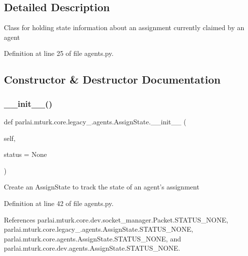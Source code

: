 \subsection{Detailed Description}
\begin{DoxyVerb}Class for holding state information about an assignment currently
claimed by an agent
\end{DoxyVerb}
 

Definition at line 25 of file agents.\+py.



\subsection{Constructor \& Destructor Documentation}
\mbox{\label{classparlai_1_1mturk_1_1core_1_1legacy__2018_1_1agents_1_1AssignState_a9451ae6465429d1cd27e208fd3f852bf}} 
\subsubsection{\texorpdfstring{\+\_\+\+\_\+init\+\_\+\+\_\+()}{\_\_init\_\_()}}
{\footnotesize\ttfamily def parlai.\+mturk.\+core.\+legacy\+\_.\+agents.\+Assign\+State.\+\_\+\+\_\+init\+\_\+\+\_\+ (\begin{DoxyParamCaption}\item[{}]{self,  }\item[{}]{status = {\ttfamily None} }\end{DoxyParamCaption})}

\begin{DoxyVerb}Create an AssignState to track the state of an agent's assignment\end{DoxyVerb}
 

Definition at line 42 of file agents.\+py.



References parlai.\+mturk.\+core.\+dev.\+socket\+\_\+manager.\+Packet.\+S\+T\+A\+T\+U\+S\+\_\+\+N\+O\+NE, parlai.\+mturk.\+core.\+legacy\+\_.\+agents.\+Assign\+State.\+S\+T\+A\+T\+U\+S\+\_\+\+N\+O\+NE, parlai.\+mturk.\+core.\+agents.\+Assign\+State.\+S\+T\+A\+T\+U\+S\+\_\+\+N\+O\+NE, and parlai.\+mturk.\+core.\+dev.\+agents.\+Assign\+State.\+S\+T\+A\+T\+U\+S\+\_\+\+N\+O\+NE.



